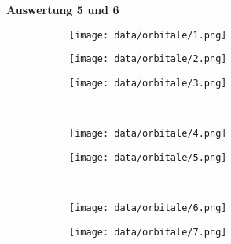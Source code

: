\documentclass[12pt]{article}
\begin{document}
\begin{onehalfspace}
\textbf{Auswertung 5 und 6}
\begin{figure}[!hptb]
    \centering
    \begin{subfigure}[b]{0.4\textwidth}
        \texttt{[image: data/orbitale/1.png]}
    \end{subfigure}
    \begin{subfigure}[b]{0.4\textwidth}
        \texttt{[image: data/orbitale/2.png]}
    \end{subfigure}

\end{figure}

\begin{figure}[!hptb]
    \centering
    \begin{subfigure}[b]{0.4\textwidth}
        \texttt{[image: data/orbitale/3.png]}
    \end{subfigure}
    ~ %
    \begin{subfigure}[b]{0.4\textwidth}
        \texttt{[image: data/orbitale/4.png]}
    \end{subfigure}

\end{figure}

\begin{figure}[!hptb]
    \centering
    \begin{subfigure}[b]{0.4\textwidth}
        \texttt{[image: data/orbitale/5.png]}
    \end{subfigure}
    ~ %
    \begin{subfigure}[b]{0.4\textwidth}
        \texttt{[image: data/orbitale/6.png]}
    \end{subfigure}

\end{figure}
\newpage
\begin{figure}[!hptb]
    \centering
    \begin{subfigure}[b]{0.4\textwidth}
        \texttt{[image: data/orbitale/7.png]}


\end{subfigure}
\end{figure}
\end{onehalfspace}
\end{document}
